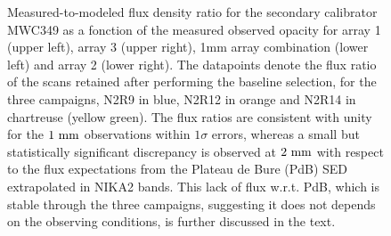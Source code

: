 \begin{figure}[ht!]
\begin{center}
    \caption[MWC349 flux density stability against observed
      opacity]{Measured-to-modeled flux density ratio for the
      secondary calibrator MWC349 as a fonction
      of the measured observed opacity for array 1 (upper left), array 3
      (upper right), 1mm array combination (lower left) and array 2 (lower
      right). The datapoints denote the flux ratio of the scans
      retained after performing the
      baseline selection, for the three campaigns, N2R9
      in blue, N2R12 in orange and N2R14 in chartreuse (yellow
      green). The flux ratios are consistent with unity for the
      $1~\rm{mm}$ observations within $1\sigma$ errors, whereas a
      small but statistically significant discrepancy is observed at
      $2~\rm{mm}$ with respect to the flux expectations from the Plateau
      de Bure (PdB) SED extrapolated in NIKA2 bands. This lack of flux
      w.r.t. PdB, which is stable through the three campaigns, suggesting it
      does not depends on the observing conditions, is further
      discussed in the text.}
    \label{fig:mwc349_flux_obstau}
  \end{center}
\end{figure}



